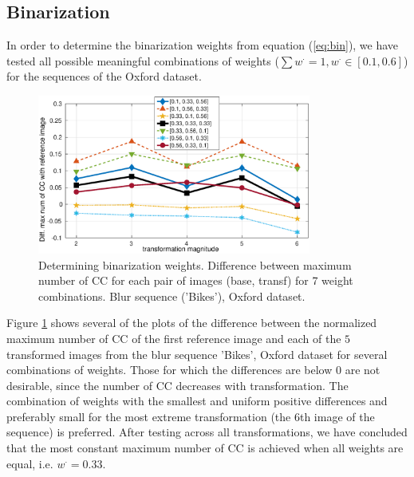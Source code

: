 \documentclass[conference,compsoc]{IEEEtran}
\begin{document}
\subsection{Binarization}
In order to determine the binarization weights from equation (\ref{eq:bin}), we have tested all possible meaningful combinations of weights ($\sum w^{\cdot} =1, w^{\cdot} \in [0.1,0.6] $) for the sequences of the Oxford dataset.
\begin{figure}[htb]
\centering
\begin{minipage}[b]{.99\linewidth}
  \centering
  \centerline{\includegraphics[width=9cm]{diff_num_cc_bin}}
\end{minipage}
\hfill
\caption{Determining binarization weights. Difference between maximum number of CC for each pair of images (base, transf) for 7 weight combinations. Blur sequence ('Bikes'), Oxford dataset.}
\label{fig:bin_bikes}
%
\end{figure}

Figure \ref{fig:bin_bikes} shows several of the plots of the difference between the normalized maximum number of CC of the first reference image and each of the $5$ transformed images from the blur sequence 'Bikes', Oxford dataset for several combinations of weights. Those for which the differences are below $0$ are not desirable, since the number of CC decreases with transformation. The combination of weights with the smallest and uniform positive differences and preferably small for the most extreme transformation (the $6$th image of the sequence) is preferred. After testing across all transformations, we have concluded that the most constant maximum number of CC is achieved when all weights are equal, i.e.  $w^{\cdot}=0.33$. 

\end{document}
